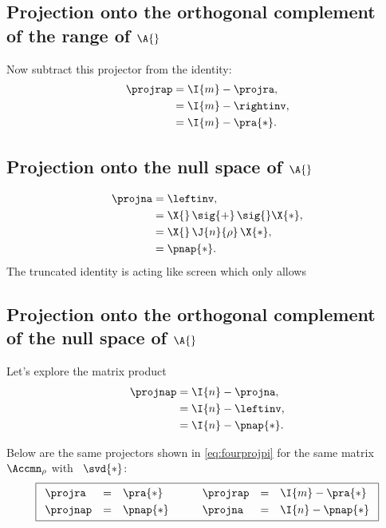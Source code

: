 \subsection{Projection onto the orthogonal complement\\ of the range of $\A{}$}
Now subtract this projector from the identity:
\begin{equation}
  \begin{split}
    \projrap& = \I{m}-\projra,\\
      &= \I{m} - \rightinv,\\
      &= \I{m} - \pra{*}.
  \end{split}
\end{equation}

\subsection{Projection onto the null space of $\A{}$}
\begin{equation}
  \begin{split}
    \projna &= \leftinv,\\
    &= \X{}\,\sig{+}\,\sig{}\X{*},\\
    & = \X{}\,\J{n}{\rho}\,\X{*},\\
    & = \pnap{*}.
  \end{split}
\end{equation}The truncated identity is acting like screen which only allows 
\subsection{Projection onto the orthogonal complement\\ of the null space of $\A{}$}
Let's explore the matrix product
\begin{equation}
  \begin{split}
    \projnap& = \I{n}-\projna,\\
      &= \I{n}-\leftinv,\\
      &= \I{n} - \pnap{*}.
  \end{split}
\end{equation}

Below are the same projectors shown in \eqref{eq:fourprojpi} for the same matrix $\Accmn_{\rho}$ with \svdl\ $\svd{*}$:
\begin{equation}
\boxed{
  \begin{array}{lcllcl}
    \projra&  = &\pra{*}  & \qquad  \projrap & = & \I{m}-\pra{*}\\[3pt]
    \projnap& = &\pnap{*} & \qquad  \projna  & = & \I{n}-\pnap{*}\\    
  \end{array}
  }
  \label{eq:fourprojsvd}
\end{equation}


